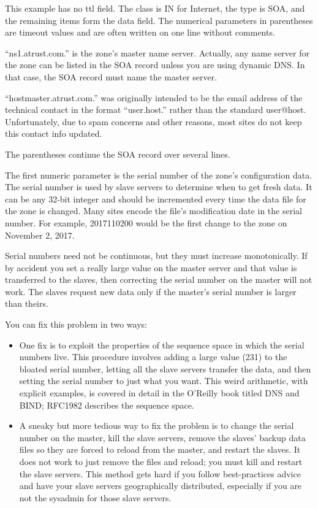 This example has no {ttl} field. The class is IN for Internet, the type
is SOA, and the remaining items form the {data} field. The numerical
parameters in parentheses are timeout values and are often written on
one line without comments.

``ns1.atrust.com.'' is the zone's master name server. Actually, any name
server for the zone can be listed in the SOA record unless you are using
dynamic DNS. In that case, the SOA record must name the master server.

``hostmaster.atrust.com.'' was originally intended to be the email
address of the technical contact in the format ``{user.host.}'' rather
than the standard {user@host.} Unfortunately, due to spam concerns and
other reasons, most sites do not keep this contact info updated.

The parentheses continue the SOA record over several lines.

The first numeric parameter is the serial number of the zone's
configuration data. The serial number is used by slave servers to
determine when to get fresh data. It can be any 32-bit integer and
should be incremented every time the data file for the zone is changed.
Many sites encode the file's modification date in the serial number. For
example, 2017110200 would be the first change to the zone on November 2,
2017.

Serial numbers need not be continuous, but they must increase
monotonically. If by accident you set a really large value on the master
server and that value is transferred to the slaves, then correcting the
serial number on the master will not work. The slaves request new data
only if the master's serial number is larger than theirs.

You can fix this problem in two ways:

\begin{itemize}
\item
  One fix is to exploit the properties of the sequence space in which
  the serial numbers live. This procedure involves adding a large value
  (2{31}) to the bloated serial number, letting all the slave servers
  transfer the data, and then setting the serial number to just what you
  want. This weird arithmetic, with explicit examples, is covered in
  detail in the O'Reilly book titled {DNS and BIND}; RFC1982 describes
  the sequence space.
\item
  A sneaky but more tedious way to fix the problem is to change the
  serial number on the master, kill the slave servers, remove the
  slaves' backup data files so they are forced to reload from the
  master, and restart the slaves. It does not work to just remove the
  files and reload; you must kill and restart the slave servers. This
  method gets hard if you follow best-practices advice and have your
  slave servers geographically distributed, especially if you are not
  the sysadmin for those slave servers.
\end{itemize}

